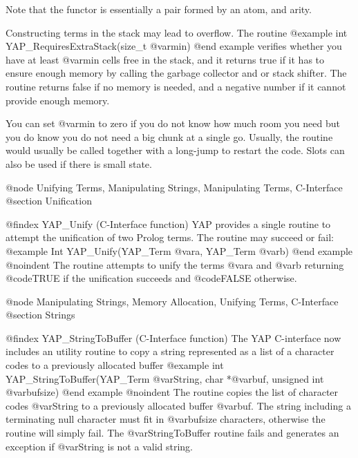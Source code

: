 {{{{{{{{{Note that the functor is essentially a pair formed by an atom, and
arity.

Constructing terms in the stack may lead to overflow. The routine
@example
      int          YAP_RequiresExtraStack(size_t @var{min})
@end example
verifies whether you have at least @var{min} cells free in the stack,
and it returns true if it has to ensure enough memory by calling the
garbage collector and or stack shifter. The routine returns false if no
memory is needed, and a negative number if it cannot provide enough
memory.

You can set @var{min} to zero if you do not know how much room you need
but you do know you do not need a big chunk at a single go. Usually, the routine
would usually be called together with a long-jump to restart the
code. Slots can also be used if there is small state.

@node Unifying Terms, Manipulating Strings, Manipulating Terms, C-Interface
@section Unification

@findex YAP_Unify (C-Interface function)
YAP provides a single routine to attempt the unification of two Prolog
terms. The routine may succeed or fail:
@example
      Int      YAP_Unify(YAP_Term @var{a}, YAP_Term @var{b})
@end example
@noindent
The routine attempts to unify the terms @var{a} and
@var{b} returning @code{TRUE} if the unification succeeds and @code{FALSE}
otherwise.

@node Manipulating Strings, Memory Allocation, Unifying Terms, C-Interface
@section Strings

@findex YAP_StringToBuffer (C-Interface function)
The YAP C-interface now includes an utility routine to copy a string
represented as a list of a character codes to a previously allocated buffer
@example
      int YAP_StringToBuffer(YAP_Term @var{String}, char *@var{buf}, unsigned int @var{bufsize})
@end example
@noindent
The routine copies the list of character codes @var{String} to a
previously allocated buffer @var{buf}. The string including a
terminating null character must fit in @var{bufsize} characters,
otherwise the routine will simply fail. The @var{StringToBuffer} routine
fails and generates an exception if @var{String} is not a valid string.

}}}}}}}}}
